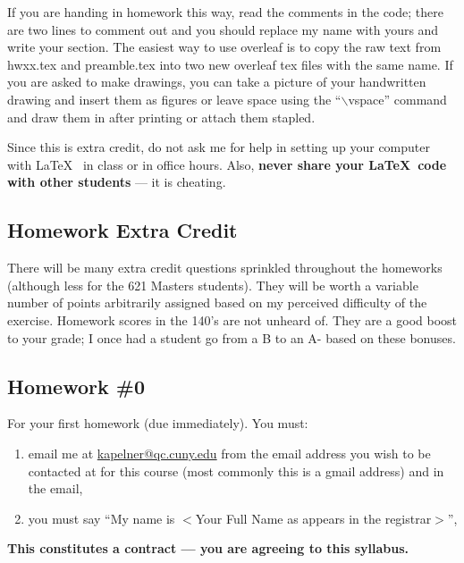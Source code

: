 \documentclass[12pt]{article}
\newcommand{\inred}[1]{\color{red}\textbf{#1} \color{black}}
\newcommand{\qu}[1]{``#1''}
\begin{document}
If you are handing in homework this way, read the comments in the code; there are two lines to comment out and you should replace my name with yours and write your section. The easiest way to use overleaf is to copy the raw text from hwxx.tex and preamble.tex into two new overleaf tex files with the same name. If you are asked to make drawings, you can take a picture of your handwritten drawing and insert them as figures or leave space using the \qu{$\backslash$vspace} command and draw them in after printing or attach them stapled.

Since this is extra credit, do not ask me for help in setting up your computer with \LaTeX~ in class or in office hours. Also, \textbf{never share your \LaTeX~code with other students} --- it is cheating.

\subsection*{Homework Extra Credit}

There will be many extra credit questions sprinkled throughout the homeworks (although less for the 621 Masters students). They will be worth a variable number of points arbitrarily assigned based on my perceived difficulty of the exercise. Homework scores in the 140's are not unheard of. They are a good boost to your grade; I once had a student go from a B to an A- based on these bonuses.

\subsection*{Homework \#0}

For your first homework (due immediately). You must:

\begin{enumerate}[(1)]
\item email me at \href{kapelner@qc.cuny.edu}{kapelner@qc.cuny.edu} from the email address you wish to be contacted at for this course (most commonly this is a gmail address) and in the email,
\item you must say \qu{My name is $<$Your Full Name as appears in the registrar$>$},
\end{enumerate}


\noindent \inred{This constitutes a contract --- you are agreeing to this syllabus.} \\
\end{document}
